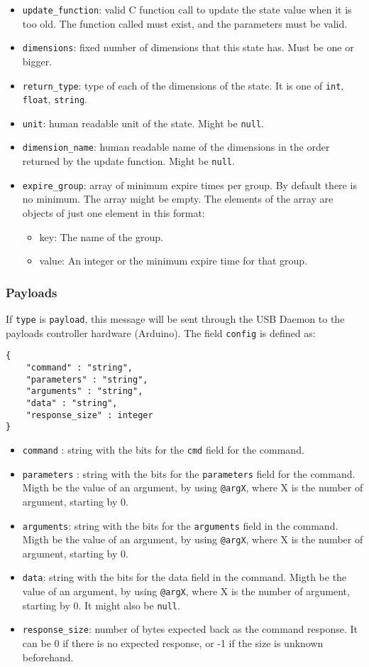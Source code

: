 \documentclass[12pt,a4paper]{report}
\begin{document}
\begin{itemize}
\item \texttt{update\_function}: valid C function call to update the state value when it is too old. The function called must exist, and the parameters must be valid.
\item \texttt{dimensions}: fixed number of dimensions that this state has. Must be one or bigger.
\item \texttt{return\_type}: type of each of the dimensions of the state. It is one of \texttt{int}, \texttt{float}, \texttt{string}.
\item \texttt{unit}: human readable unit of the state. Might be \texttt{null}.
\item \texttt{dimension\_name}: human readable name of the dimensions in the order returned by the update function. Might be \texttt{null}.
\item \texttt{expire\_group}: array of minimum expire times per group. By default there is no minimum. The array might be empty. The elements of the array are objects of just one element in this format:
\begin{itemize}
\item key: The name of the group.
\item value: An integer or the minimum expire time for that group.
\end{itemize}
\end{itemize}

\subsubsection*{Payloads}
If \texttt{type} is \texttt{payload}, this message will be sent through the USB Daemon to the payloads controller hardware (Arduino). The field \texttt{config} is defined as:
\begin{lstlisting}
{
	"command" : "string",
	"parameters" : "string",
	"arguments" : "string",
	"data" : "string",
	"response_size" : integer
}
\end{lstlisting}

\begin{itemize}
\item \texttt{command} : string with the bits for the \texttt{cmd} field for the command.
\item \texttt{parameters} : string with the bits for the \texttt{parameters} field for the command. Migth be the value of an argument, by using \texttt{@argX}, where X is the number of argument, starting by 0.
\item \texttt{arguments}: string with the bits for the \texttt{arguments} field in the command. Migth be the value of an argument, by using \texttt{@argX}, where X is the number of argument, starting by 0.
\item \texttt{data}: string with the bits for the data field in the command. Migth be the value of an argument, by using \texttt{@argX}, where X is the number of argument, starting by 0. It might also be \texttt{null}.
\item \texttt{response\_size}: number of bytes expected back as the command response. It can be 0 if there is no expected response, or -1 if the size is unknown beforehand.
\end{itemize}
\end{document}
